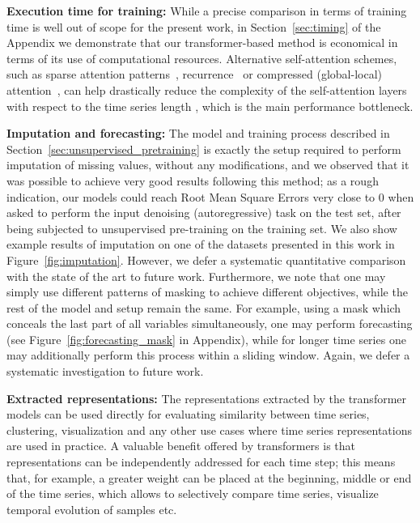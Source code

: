 \documentclass{article} \usepackage{iclr2021_conference,times}
\begin{document}
\textbf{Execution time for training:} While a precise comparison in terms of training time is well out of scope for the present work, in Section~\ref{sec:timing} of the Appendix we demonstrate that our transformer-based method is economical in terms of its use of computational resources. Alternative self-attention schemes, such as sparse attention patterns~\citep{li2019enhancing}, recurrence~\citep{dai_transformer-xl_2019} or compressed (global-local) attention~\citep{beltagy_longformer_2020}, can help drastically reduce the  complexity of the self-attention layers with respect to the time series length , which is the main performance bottleneck.

\textbf{Imputation and forecasting:} The model and training process described in Section~\ref{sec:unsupervised_pretraining} is exactly the setup required to perform imputation of missing values, without any modifications, and we observed that it was possible to achieve very good results following this method; as a rough indication, our models could reach Root Mean Square Errors very close to 0 when asked to perform the input denoising (autoregressive) task on the test set, after being subjected to unsupervised pre-training on the training set. We also show example results of imputation on one of the datasets presented in this work in Figure~\ref{fig:imputation}. However, we defer a systematic quantitative comparison with the state of the art to future work. Furthermore, we note that one may simply use different patterns of masking to achieve different objectives, while the rest of the model and setup remain the same. For example, using a mask which conceals the last part of all variables simultaneously, one may perform forecasting (see Figure~\ref{fig:forecasting_mask} in Appendix), while for longer time series one may additionally perform this process within a sliding window. Again, we defer a systematic investigation to future work.

\textbf{Extracted representations:} The representations   extracted by the transformer models can be used directly for evaluating similarity between time series, clustering, visualization and any other use cases where time series representations are used in practice. A valuable benefit offered by transformers is that representations can be independently addressed for each time step; this means that, for example, a greater weight can be placed at the beginning, middle or end of the time series, which allows to selectively compare time series, visualize temporal evolution of samples etc.
\end{document}
